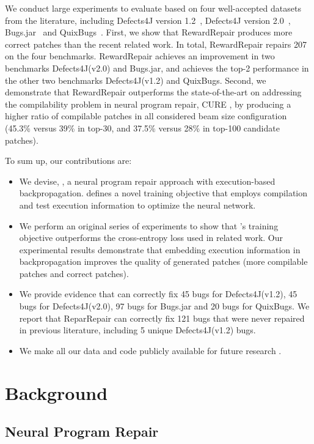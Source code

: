 We conduct large experiments to evaluate \approach based on four well-accepted datasets from the literature, including Defects4J version 1.2~\cite{defects4j}, Defects4J  version 2.0~\cite{defects4j}, Bugs.jar~\cite{Bugsjar-MSR18} and QuixBugs~\cite{lin2017quixbugs}.
First, we show that RewardRepair produces more correct patches than the recent related work. In total, RewardRepair repairs 207 on the four benchmarks.
RewardRepair achieves an improvement in two benchmarks Defects4J(v2.0) and Bugs.jar, and achieves the top-2 performance in the other two benchmarks Defects4J(v1.2) and QuixBugs. 
Second, we demonstrate that RewardRepair outperforms the state-of-the-art on addressing the compilability problem in neural program repair, CURE \cite{CURE-icse21}, by producing a higher ratio of compilable patches in all considered beam size configuration (45.3\% versus 39\% in top-30, and 37.5\% versus 28\% in top-100 candidate patches).

To sum up, our contributions are:
\begin{itemize}
    \item We devise, \approach, a neural program repair approach with execution-based backpropagation. \approach defines a novel training objective that employs compilation and test execution information to optimize the neural network.
    \item We perform an original series of experiments to show that  \approach's training objective outperforms the cross-entropy loss used in related work. Our experimental results demonstrate that embedding execution information in backpropagation  improves the quality of generated patches (more compilable patches and correct patches).
    \item We provide evidence that \approach can correctly fix 45 bugs for Defects4J(v1.2), 45 bugs for Defects4J(v2.0), 97 bugs for Bugs.jar and 20 bugs for QuixBugs. We report that ReparRepair can correctly fix 121 bugs that were never repaired in previous literature, including 5 unique Defects4J(v1.2) bugs.
    \item We make all our data and code publicly available for future research \cite{experiment}.
\end{itemize}

\section{Background}
\label{sec:background_neural}

\subsection{Neural Program Repair}


